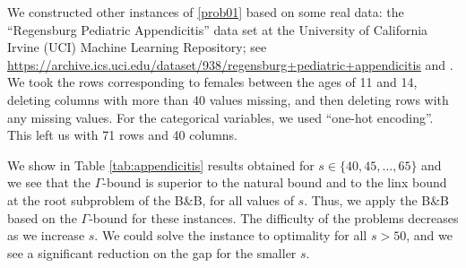 \documentclass[smallextended]{svjour3hack}       %
\begin{document}
 We constructed other instances of \ref{prob01}
 based on some real data: the ``Regensburg Pediatric Appendicitis'' data set at the
 University of California Irvine (UCI) Machine Learning Repository; see \url{https://archive.ics.uci.edu/dataset/938/regensburg+pediatric+appendicitis} and
 \cite{Appendicitis}. 
 We took the rows corresponding to females 
between the ages of 11 and 14, deleting columns with more than 
40 values missing, and then deleting rows with any missing values.
For the categorical variables,  we used ``one-hot encoding''. 
This left us with 71 rows and 40 columns.  

 We show in Table \ref{tab:appendicitis}
results obtained for $s\in\{40,45,\ldots,65\}$ and we see that the $\Gamma$-bound is superior to the natural bound and to the linx bound at the root subproblem of the B\&B, for all values of $s$. Thus, we apply the B\&B based on the $\Gamma$-bound for these instances. The difficulty of the problems decreases as we increase $s$. We could solve the instance to optimality for all  $s>50$, and we see a significant reduction on the gap for the smaller $s$.
\end{document}
